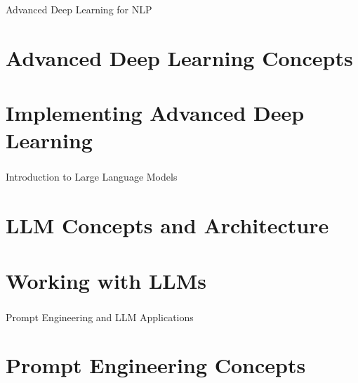 \begin{frame}[fragile]\frametitle{}
\begin{center}
{\Large Advanced Deep Learning for NLP}
\end{center}
\end{frame}

\section[Day 9 Theory]{Advanced Deep Learning Concepts}




\section[Day 9 Lab]{Implementing Advanced Deep Learning}




\begin{frame}[fragile]\frametitle{}
\begin{center}
{\Large Introduction to Large Language Models}
\end{center}
\end{frame}

\section[Day 10 Theory]{LLM Concepts and Architecture}





\section[Day 10 Lab]{Working with LLMs}



\begin{frame}[fragile]\frametitle{}
\begin{center}
{\Large Prompt Engineering and LLM Applications}
\end{center}
\end{frame}

\section[Day 11 Theory]{Prompt Engineering Concepts}





